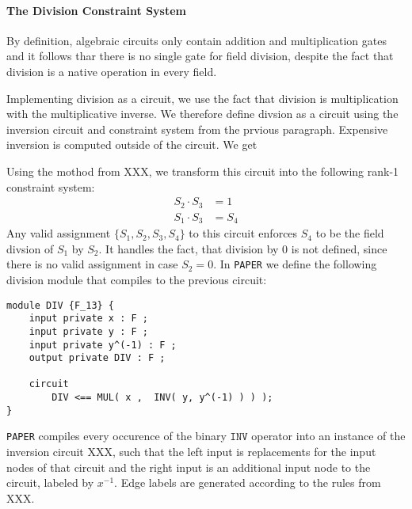 \paragraph{The Division Constraint System} By definition, algebraic circuits only contain addition and multiplication gates and it follows thar there is no single gate for field division, despite the fact that division is a native operation in every field.

Implementing division as a circuit, we use the fact that division is multiplication with the multiplicative inverse. We therefore define divsion as a circuit using the inversion circuit and constraint system from the prvious paragraph. Expensive inversion is computed outside of the circuit. We get 
\begin{center}
\end{center} 
Using the mothod from XXX, we transform this circuit into the following rank-1 constraint system:
\begin{align*}
S_2 \cdot S_3 &= 1\\
S_1 \cdot S_3 &= S_4
\end{align*}
Any valid assignment $\{S_1,S_2,S_3,S_4\}$ to this circuit enforces $S_4$ to be the field divsion of $S_1$ by $S_2$. It handles the fact, that division by $0$ is not defined, since there is no valid assignment in case $S_2=0$. In \texttt{PAPER} we define the following division module that compiles to the previous circuit:
\begin{lstlisting}
module DIV {F_13} {
	input private x : F ; 
	input private y : F ;
	input private y^(-1) : F ; 
	output private DIV : F ;

	circuit
		DIV <== MUL( x ,  INV( y, y^(-1) ) ) );
}
\end{lstlisting}
\texttt{PAPER} compiles every occurence of the binary $\mathtt{INV}$ operator into an instance of the inversion circuit XXX, such that the left input is replacements for the input nodes of that circuit and the right input is an additional input node to the circuit, labeled by $x^{-1}$. Edge labels are generated according to the rules from XXX.


